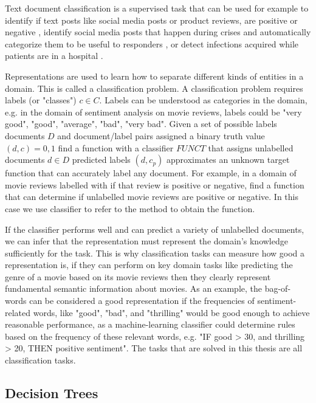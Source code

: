 Text document classification is a supervised task that can be used for example to identify if text posts like social media posts or product reviews, are positive or negative \cite{Burel2018},  identify social media posts that happen during crises and automatically categorize them to be useful to responders \cite{Burel2018},  or detect infections acquired while patients are in a hospital . 

Representations are  used to learn how to separate different kinds of entities in a domain. This is called a classification problem. A classification problem requires  labels (or "classes") $c \in C$. Labels can be understood as categories in the domain, e.g. in the domain of sentiment analysis on movie reviews, labels could be "very good", "good", "average", "bad", "very bad". Given a set of possible labels documents $D$ and document/label pairs assigned a binary truth value $(d, c) = {0, 1}$ find a function with a classifier $FUNCT$ that assigns unlabelled documents $d \in D$ predicted labels $(d, c_p) $ approximates an unknown target function that can accurately label any document. For example, in a domain of movie reviews labelled with if that review is positive or negative, find a function that can determine if unlabelled movie reviews are positive or negative. In this case we use classifier to refer to the method to obtain the function.

If the classifier performs well and can predict a variety of unlabelled documents, we can infer that  the representation must represent the domain's knowledge sufficiently for the task. This is why classification tasks can measure how good a representation is, if they can perform on key domain tasks like predicting the genre of a movie based on its movie reviews then they clearly represent fundamental semantic information about movies.  As an example,  the bag-of-words can be considered a good representation if the frequencies of sentiment-related words, like "good", "bad", and "thrilling" would be good enough to achieve reasonable performance, as a machine-learning classifier could determine rules based on the frequency of these relevant words, e.g. "IF good > 30, and thrilling > 20, THEN positive sentiment". The tasks that are solved in this thesis are all classification tasks. 

\subsection{Decision Trees}\label{bg:trees}

